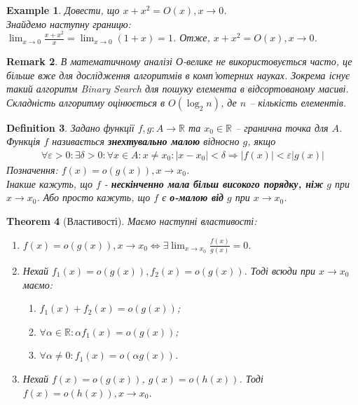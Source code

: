 \documentclass[a4paper, 14pt]{article}
\theoremstyle{theoremdd}
\newtheorem{theorem}{Theorem}[subsection]
\theoremstyle{theoremdd}
\newtheorem{definition}[theorem]{Definition}
\theoremstyle{theoremdd}
\theoremstyle{theoremdd}
\newtheorem{example}[theorem]{Example}
\theoremstyle{theoremdd}
\theoremstyle{theoremdd}
\newtheorem{remark}[theorem]{Remark}
\theoremstyle{theoremdd}
\theoremstyle{theoremdd}
\begin{document}
\begin{example}
Довести, що $x+x^2 = O(x), x \to 0$.\\
Знайдемо наступну границю:\\
$\displaystyle \lim_{x \to 0} \frac{x+x^2}{x} = \lim_{x \to 0}(1+x) = 1$. Отже, $x+x^2 = O(x), x \to 0$.
\end{example}

\begin{remark}
В математичному аналізі О-велике не використовується часто, це більше вже для дослідження алгоритмів в комп'ютерних науках. Зокрема існує такий алгоритм Binary Search для пошуку елемента в відсортованому масиві. Складність алгоритму оцінюється в $O(\log_2 n)$, де $n$ -- кількість елементів.
\end{remark}

\begin{definition}
Задано функції $f,g \colon A \to \mathbb{R}$ та $x_0 \in \mathbb{R}$ -- гранична точка для $A$.\\
Функція $f$ називається \textbf{знехтувально малою} відносно $g$, якщо
\begin{align*}
\forall \varepsilon>0: \exists \delta > 0: \forall x \in A: x \neq x_0: |x-x_0| < \delta \Rightarrow |f(x)| < \varepsilon |g(x)|
\end{align*}
Позначення: $f(x) = o(g(x)), x \to x_0$.\\
Інакше кажуть, що $f$ - \textbf{нескінченно мала більш високого порядку, ніж} $g$ при $x \to x_0$. Або просто кажуть, що $f$ є \textbf{о-малою від} $g$ при $x \to x_0$.
\end{definition}

\begin{theorem}[Властивості]
Маємо наступні властивості:
\begin{enumerate}[nosep,wide=0pt,label={\arabic*)}]
\item $f(x) = o(g(x)), x \to x_0 \iff \displaystyle \exists \lim_{x \to x_0} \frac{f(x)}{g(x)} = 0$.
\item Нехай $f_1(x) = o(g(x)), f_2(x) = o(g(x))$. Тоді всюди при $x \to x_0$ маємо:
\begin{enumerate}[nosep,label={\alph*)}]
\item $f_1(x) + f_2(x) = o(g(x))$;
\item $\forall \alpha \in \mathbb{R}: \alpha f_1(x) = o(g(x))$;
\item $\forall \alpha \neq 0: f_1(x) = o(\alpha g(x))$.
\end{enumerate}
\item Нехай $f(x) = o(g(x))$, $g(x) = o(h(x))$. Тоді $f(x) = o(h(x)), x \to x_0$.
\end{enumerate}
\end{theorem}
\end{document}
